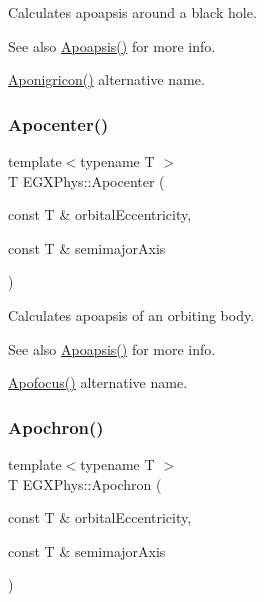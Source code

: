 Calculates apoapsis around a black hole. 

\begin{DoxySeeAlso}{See also}
\hyperlink{group___e_g_x_phys-_apoapsis_gaf962e650bf84a568458e8eb39b1c61ba}{Apoapsis()} for more info. 

\hyperlink{group___e_g_x_phys-_apoapsis_ga83e866e2f887ff8eafbc3971d4cab8be}{Aponigricon()} alternative name. 
\end{DoxySeeAlso}
\mbox{\label{group___e_g_x_phys-_apoapsis_ga5e51a53e2f974264bada34f159fdc948}} 
\subsubsection{\texorpdfstring{Apocenter()}{Apocenter()}}
{\footnotesize\ttfamily template$<$typename T $>$ \\
T E\+G\+X\+Phys\+::\+Apocenter (\begin{DoxyParamCaption}\item[{const T \&}]{orbital\+Eccentricity,  }\item[{const T \&}]{semimajor\+Axis }\end{DoxyParamCaption})}



Calculates apoapsis of an orbiting body. 

\begin{DoxySeeAlso}{See also}
\hyperlink{group___e_g_x_phys-_apoapsis_gaf962e650bf84a568458e8eb39b1c61ba}{Apoapsis()} for more info. 

\hyperlink{group___e_g_x_phys-_apoapsis_gaa53ac4e15bc6bc0fecf72eadb7a513e0}{Apofocus()} alternative name. 
\end{DoxySeeAlso}
\mbox{\label{group___e_g_x_phys-_apoapsis_gae4ea146039e6f32022321f0998e715e8}} 
\subsubsection{\texorpdfstring{Apochron()}{Apochron()}}
{\footnotesize\ttfamily template$<$typename T $>$ \\
T E\+G\+X\+Phys\+::\+Apochron (\begin{DoxyParamCaption}\item[{const T \&}]{orbital\+Eccentricity,  }\item[{const T \&}]{semimajor\+Axis }\end{DoxyParamCaption})}



